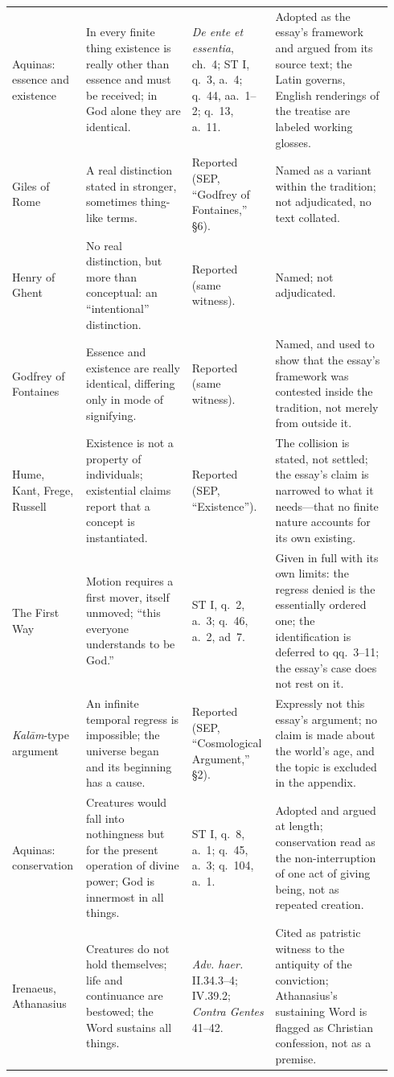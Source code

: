 \begin{longtable}{>{\raggedright\arraybackslash}p{0.155\linewidth}>{\raggedright\arraybackslash}p{0.275\linewidth}>{\raggedright\arraybackslash}p{0.215\linewidth}>{\raggedright\arraybackslash}p{0.30\linewidth}}
Aquinas: essence and existence & In every finite thing existence is really other than essence and must be received; in God alone they are identical. & \emph{De ente et essentia}, ch.~4; ST I, q.~3, a.~4; q.~44, aa.~1--2; q.~13, a.~11. & Adopted as the essay's framework and argued from its source text; the Latin governs, English renderings of the treatise are labeled working glosses.\\
Giles of Rome & A real distinction stated in stronger, sometimes thing-like terms. & Reported (SEP, ``Godfrey of Fontaines,'' §6). & Named as a variant within the tradition; not adjudicated, no text collated.\\
Henry of Ghent & No real distinction, but more than conceptual: an ``intentional'' distinction. & Reported (same witness). & Named; not adjudicated.\\
Godfrey of Fontaines & Essence and existence are really identical, differing only in mode of signifying. & Reported (same witness). & Named, and used to show that the essay's framework was contested inside the tradition, not merely from outside it.\\
Hume, Kant, Frege, Russell & Existence is not a property of individuals; existential claims report that a concept is instantiated. & Reported (SEP, ``Existence''). & The collision is stated, not settled; the essay's claim is narrowed to what it needs---that no finite nature accounts for its own existing.\\
The First Way & Motion requires a first mover, itself unmoved; ``this everyone understands to be God.'' & ST I, q.~2, a.~3; q.~46, a.~2, ad~7. & Given in full with its own limits: the regress denied is the essentially ordered one; the identification is deferred to qq.~3--11; the essay's case does not rest on it.\\
\emph{Kal\=am}-type argument & An infinite temporal regress is impossible; the universe began and its beginning has a cause. & Reported (SEP, ``Cosmological Argument,'' §2). & Expressly not this essay's argument; no claim is made about the world's age, and the topic is excluded in the appendix.\\
Aquinas: conservation & Creatures would fall into nothingness but for the present operation of divine power; God is innermost in all things. & ST I, q.~8, a.~1; q.~45, a.~3; q.~104, a.~1. & Adopted and argued at length; conservation read as the non-interruption of one act of giving being, not as repeated creation.\\
Irenaeus, Athanasius & Creatures do not hold themselves; life and continuance are bestowed; the Word sustains all things. & \emph{Adv. haer.} II.34.3--4; IV.39.2; \emph{Contra Gentes} 41--42. & Cited as patristic witness to the antiquity of the conviction; Athanasius's sustaining Word is flagged as Christian confession, not as a premise.\\

\end{longtable}
